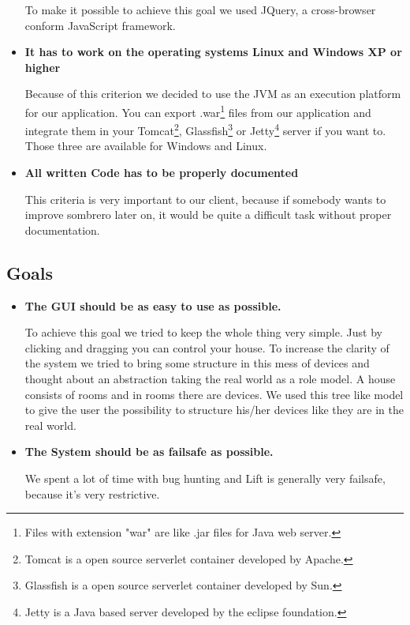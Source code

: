 \begin{itemize}
        To make it possible to achieve this goal we used JQuery, a cross-browser conform JavaScript framework.
    \item \textbf{It has to work on the operating systems Linux and Windows XP or higher}
        
        Because of this criterion we decided to use the JVM as an execution platform for our application. You can export .war\footnote[1]{Files with extension "war" are like .jar files for Java web server.} files from our application and integrate them in your Tomcat\footnote[2]{Tomcat is a open source serverlet container developed by Apache.}, Glassfish\footnote[3]{Glassfish is a open source serverlet container developed by Sun.} or Jetty\footnote[4]{Jetty is a Java based server developed by the eclipse foundation.} server if you want to. Those three are available for Windows and Linux.
    \item \textbf{All written Code has to be properly documented}
    
        This criteria is very important to our client, because if somebody wants to improve sombrero later on, it would be quite a difficult task without proper documentation.
  \end{itemize}

\subsection{Goals}
  \begin{itemize}
    \item \textbf{The GUI should be as easy to use as possible.}
    
        To achieve this goal we tried to keep the whole thing very simple. Just by clicking and dragging you can control your house. To increase the clarity of the system we tried to bring some structure in this mess of devices and thought about an abstraction taking the real world as a role model. A house consists of rooms and in rooms there are devices. We used this tree like model to give the user the possibility to structure his/her devices like they are in the real world.
    \item \textbf{The System should be as failsafe as possible.}
    
        We spent a lot of time with bug hunting and Lift is generally very failsafe, because it's very restrictive.
  \end{itemize} 